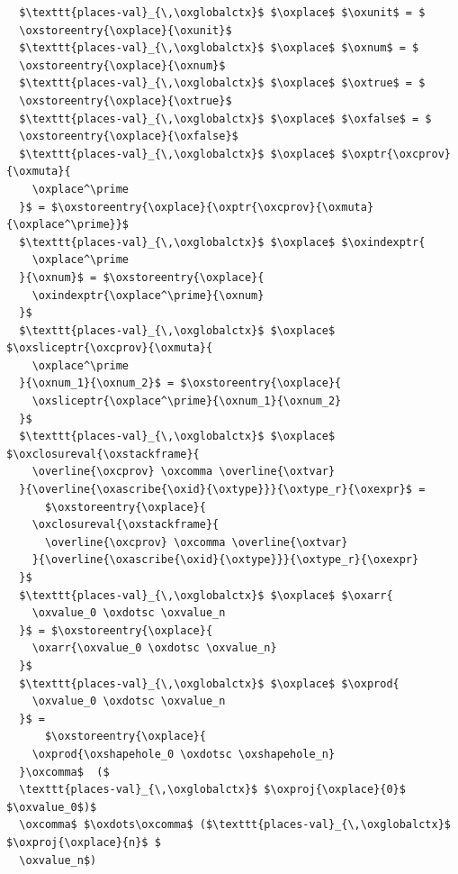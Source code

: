 \begin{lstlisting}
  $\texttt{places-val}_{\,\oxglobalctx}$ $\oxplace$ $\oxunit$ = $
  \oxstoreentry{\oxplace}{\oxunit}$
  $\texttt{places-val}_{\,\oxglobalctx}$ $\oxplace$ $\oxnum$ = $
  \oxstoreentry{\oxplace}{\oxnum}$
  $\texttt{places-val}_{\,\oxglobalctx}$ $\oxplace$ $\oxtrue$ = $
  \oxstoreentry{\oxplace}{\oxtrue}$
  $\texttt{places-val}_{\,\oxglobalctx}$ $\oxplace$ $\oxfalse$ = $
  \oxstoreentry{\oxplace}{\oxfalse}$
  $\texttt{places-val}_{\,\oxglobalctx}$ $\oxplace$ $\oxptr{\oxcprov}{\oxmuta}{
    \oxplace^\prime
  }$ = $\oxstoreentry{\oxplace}{\oxptr{\oxcprov}{\oxmuta}{\oxplace^\prime}}$
  $\texttt{places-val}_{\,\oxglobalctx}$ $\oxplace$ $\oxindexptr{
    \oxplace^\prime
  }{\oxnum}$ = $\oxstoreentry{\oxplace}{
    \oxindexptr{\oxplace^\prime}{\oxnum}
  }$
  $\texttt{places-val}_{\,\oxglobalctx}$ $\oxplace$ $\oxsliceptr{\oxcprov}{\oxmuta}{
    \oxplace^\prime
  }{\oxnum_1}{\oxnum_2}$ = $\oxstoreentry{\oxplace}{
    \oxsliceptr{\oxplace^\prime}{\oxnum_1}{\oxnum_2}
  }$
  $\texttt{places-val}_{\,\oxglobalctx}$ $\oxplace$ $\oxclosureval{\oxstackframe}{
    \overline{\oxcprov} \oxcomma \overline{\oxtvar}
  }{\overline{\oxascribe{\oxid}{\oxtype}}}{\oxtype_r}{\oxexpr}$ =
      $\oxstoreentry{\oxplace}{
    \oxclosureval{\oxstackframe}{
      \overline{\oxcprov} \oxcomma \overline{\oxtvar}
    }{\overline{\oxascribe{\oxid}{\oxtype}}}{\oxtype_r}{\oxexpr}
  }$
  $\texttt{places-val}_{\,\oxglobalctx}$ $\oxplace$ $\oxarr{
    \oxvalue_0 \oxdotsc \oxvalue_n
  }$ = $\oxstoreentry{\oxplace}{
    \oxarr{\oxvalue_0 \oxdotsc \oxvalue_n}
  }$
  $\texttt{places-val}_{\,\oxglobalctx}$ $\oxplace$ $\oxprod{
    \oxvalue_0 \oxdotsc \oxvalue_n
  }$ =
      $\oxstoreentry{\oxplace}{
    \oxprod{\oxshapehole_0 \oxdotsc \oxshapehole_n}
  }\oxcomma$  ($
  \texttt{places-val}_{\,\oxglobalctx}$ $\oxproj{\oxplace}{0}$ $\oxvalue_0$)$
  \oxcomma$ $\oxdots\oxcomma$ ($\texttt{places-val}_{\,\oxglobalctx}$ $\oxproj{\oxplace}{n}$ $
  \oxvalue_n$)
\end{lstlisting}
